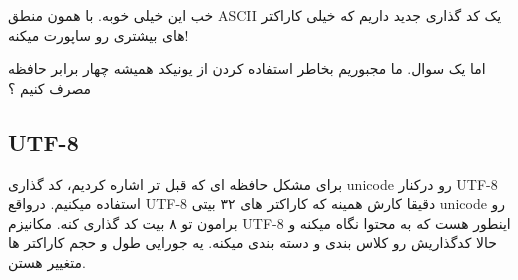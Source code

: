 خب این خیلی خوبه. با همون منطق ASCII یک کد گذاری جدید داریم که خیلی کاراکتر های بیشتری رو ساپورت میکنه!

اما یک سوال. ما مجبوریم بخاطر استفاده کردن از یونیکد همیشه چهار برابر حافظه مصرف کنیم ؟

\subsection{UTF-8}

برای مشکل حافظه ای که قبل تر اشاره کردیم، کد گذاری unicode رو درکنار UTF-8 استفاده میکنیم.
درواقع UTF-8 دقیقا کارش همینه که کاراکتر های ۳۲ بیتی unicode رو برامون تو ۸ بیت کد گذاری کنه.
مکانیزم UTF-8 اینطور هست که به محتوا نگاه میکنه و حالا کدگذاریش رو کلاس بندی و دسته بندی میکنه. یه جورایی طول و حجم کاراکتر ها متغییر هستن.

